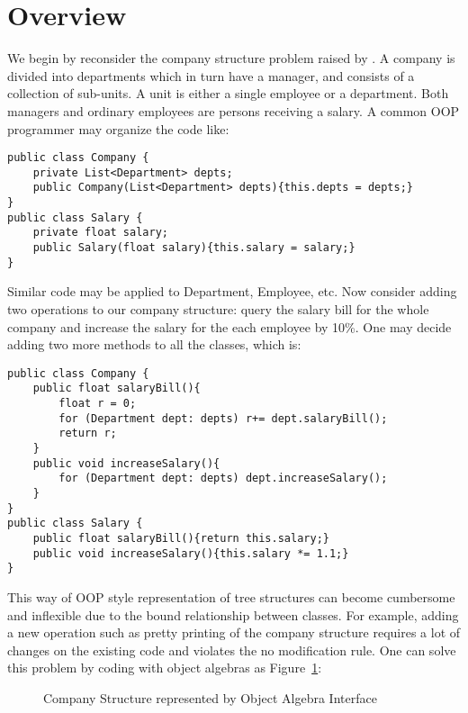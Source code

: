 
\section{Overview}\label{subsec:overview}

We begin by reconsider the company structure problem raised by \cite{ralf03syb}. A company is divided into departments which in turn have a manager, and consists of a collection of sub-units. A unit is either a single employee or a department. Both managers and ordinary employees are persons receiving a salary. A common OOP programmer may organize the code like: 

\begin{lstlisting}[numbers=none]
public class Company {
	private List<Department> depts;
	public Company(List<Department> depts){this.depts = depts;}
}
public class Salary {
	private float salary;
	public Salary(float salary){this.salary = salary;}
} 
\end{lstlisting}
Similar code may be applied to Department, Employee, etc. Now consider adding two operations to our company structure: query the salary bill for the whole company and increase the salary for the each employee by 10\%. One may decide adding two more methods to all the classes, which is: 
\begin{lstlisting}[numbers=none]
public class Company {
	public float salaryBill(){
		float r = 0; 
		for (Department dept: depts) r+= dept.salaryBill(); 
		return r;
	}
	public void increaseSalary(){
		for (Department dept: depts) dept.increaseSalary();
	}
}
public class Salary {
	public float salaryBill(){return this.salary;}
	public void increaseSalary(){this.salary *= 1.1;}
}
\end{lstlisting}
This way of OOP style representation of tree structures can become cumbersome and inflexible due to the bound relationship between classes. For example, adding a new operation such as pretty printing of the company structure requires a lot of changes on the existing code and violates the no modification rule. One can solve this problem by coding with object algebras as Figure~\ref{syb_tree}: 
\begin{figure}[tb]
\vspace{-.1in}
\caption{Company Structure represented by Object Algebra Interface}
\label{syb_tree}
\end{figure}


